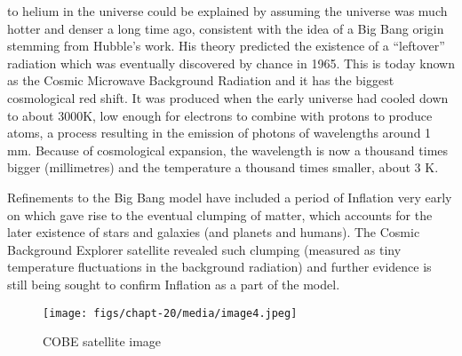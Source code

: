 \documentclass[revision-guide.tex]{subfiles}
\begin{document}
to helium in the universe could be explained by assuming the universe
was much hotter and denser a long time ago, consistent with the idea of
a Big Bang origin stemming from Hubble's work. His theory predicted the
existence of a ``leftover'' radiation which was eventually discovered by
chance in 1965. This is today known as the Cosmic Microwave Background
Radiation and it has the biggest cosmological red shift. It was produced
when the early universe had cooled down to about 3000K, low enough for
electrons to combine with protons to produce atoms, a process resulting
in the emission of photons of wavelengths around 1 mm. Because of
cosmological expansion, the wavelength is now a thousand times bigger
(millimetres) and the temperature a thousand times smaller, about 3 K.

Refinements to the Big Bang model have included a period of Inflation
very early on which gave rise to the eventual clumping of matter, which
accounts for the later existence of stars and galaxies (and planets and
humans). The Cosmic Background Explorer satellite revealed such clumping
(measured as tiny temperature fluctuations in the background radiation)
and further evidence is still being sought to confirm Inflation as a
part of the model.

\begin{figure}[h]
\texttt{[image: figs/chapt-20/media/image4.jpeg]}
\caption{COBE satellite image}
\end{figure}
\end{document}

